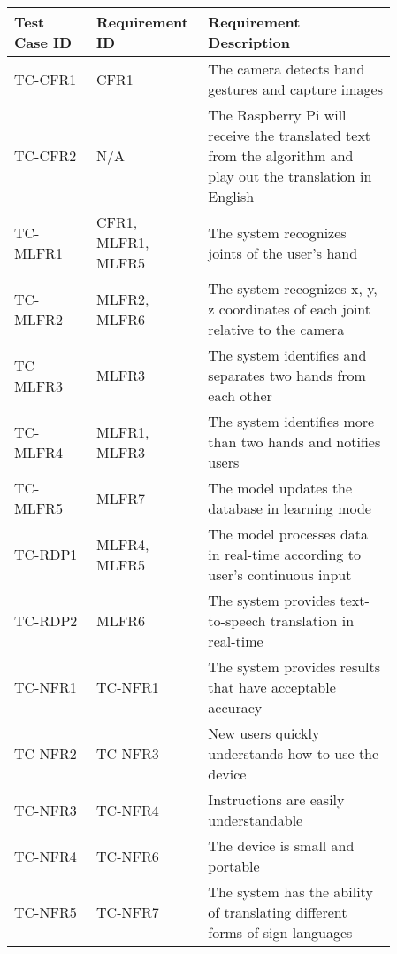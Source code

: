\documentclass[12pt]{article}
\begin{document}
\renewcommand{\arraystretch}{1.2}
\noindent \begin{tabularx}{\textwidth}{p{0.2\linewidth}|p{0.2\linewidth}|p{0.46\linewidth}}
\toprule
\textbf{Test Case ID} & \textbf{Requirement ID} & \textbf{Requirement Description}\\
\midrule
TC-CFR1 & CFR1 & The camera detects hand gestures and capture images\\ \hline
TC-CFR2 & N/A & The Raspberry Pi will receive the translated text from the algorithm and play out the translation in English\\ \hline
TC-MLFR1 & CFR1, MLFR1, MLFR5 & The system recognizes joints of the user’s hand\\ \hline
TC-MLFR2 & MLFR2, MLFR6 & The system recognizes x, y, z coordinates of each joint relative to the camera\\ \hline
TC-MLFR3 & MLFR3 & The system identifies and separates two hands from each other\\ \hline
TC-MLFR4 & MLFR1, MLFR3 & The system identifies more than two hands and notifies users\\ \hline
TC-MLFR5 & MLFR7 & The model updates the database in learning mode\\ \hline
TC-RDP1 & MLFR4, MLFR5 & The model processes data in real-time according to user’s continuous input\\ \hline
TC-RDP2 & MLFR6 & The system provides text-to-speech translation in real-time\\ \hline
TC-NFR1 & TC-NFR1 & The system provides results that have acceptable accuracy\\ \hline
TC-NFR2 & TC-NFR3 & New users quickly understands how to use the device\\ \hline
TC-NFR3 & TC-NFR4 & Instructions are easily understandable\\ \hline
TC-NFR4 & TC-NFR6 & The device is small and portable\\ \hline
TC-NFR5 & TC-NFR7 & The system has the ability of translating different forms of sign languages\\
\bottomrule
\end{tabularx}

\newpage


\end{document}
